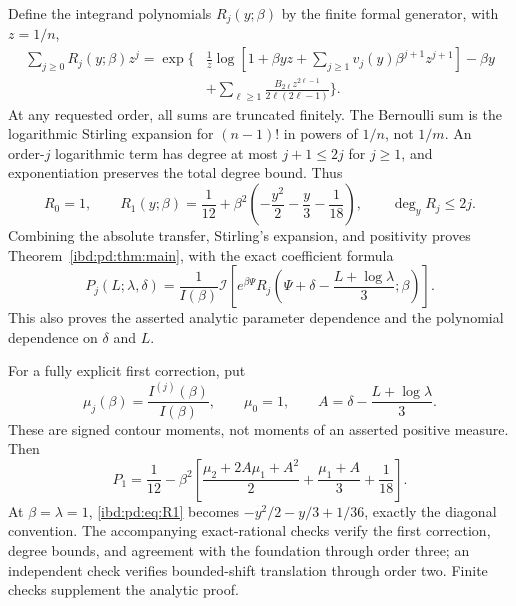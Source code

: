 \documentclass[11pt,letterpaper]{article}
\theoremstyle{remark}\newtheorem{remark}[theorem]{Remark}
\newcommand{\I}{\mathcal I}
\begin{document}
Define the integrand polynomials $R_j(y;\beta)$ by the finite formal generator, with $z=1/n$,
\begin{align}\label{ibd:pd:eq:Rgen}
 \sum_{j\geq0}R_j(y;\beta)z^j
 =\exp\Bigg\{&\frac1z\log\left[1+\beta yz+
 \sum_{j\geq1}v_j(y)\beta^{j+1}z^{j+1}\right]-\beta y\\
 &+\sum_{\ell\geq1}\frac{B_{2\ell}z^{2\ell-1}}{2\ell(2\ell-1)}\Bigg\}.\nonumber
\end{align}
At any requested order, all sums are truncated finitely. The Bernoulli sum is the logarithmic Stirling expansion for $(n-1)!$ in powers of $1/n$, not $1/m$. An order-$j$ logarithmic term has degree at most $j+1\leq2j$ for $j\geq1$, and exponentiation preserves the total degree bound. Thus
\begin{equation}\label{ibd:pd:eq:R1}
 R_0=1,\qquad
 R_1(y;\beta)=\frac1{12}+\beta^2\left(-\frac{y^2}{2}-\frac y3-\frac1{18}\right),
 \qquad\deg_yR_j\leq2j.
\end{equation}
Combining the absolute transfer, Stirling's expansion, and positivity proves Theorem~\ref{ibd:pd:thm:main}, with the exact coefficient formula
\begin{equation}\label{ibd:pd:eq:Pgen}
 P_j(L;\lambda,\delta)=\frac1{I(\beta)}\I\!\left[
 e^{\beta\Psi}R_j\!\left(\Psi+\delta-\frac{L+\log\lambda}{3};\beta\right)\right].
\end{equation}
This also proves the asserted analytic parameter dependence and the polynomial dependence on $\delta$ and $L$.

For a fully explicit first correction, put
\[
 \mu_j(\beta)=\frac{I^{(j)}(\beta)}{I(\beta)},\qquad \mu_0=1,\qquad
 A=\delta-\frac{L+\log\lambda}{3}.
\]
These are signed contour moments, not moments of an asserted positive measure. Then
\begin{equation}\label{ibd:pd:eq:P1}
 P_1=\frac1{12}-\beta^2\left[
 \frac{\mu_2+2A\mu_1+A^2}{2}+
 \frac{\mu_1+A}{3}+\frac1{18}\right].
\end{equation}
At $\beta=\lambda=1$, \eqref{ibd:pd:eq:R1} becomes
$-y^2/2-y/3+1/36$, exactly the diagonal convention. The accompanying exact-rational checks verify the first correction, degree bounds, and agreement with the foundation through order three; an independent check verifies bounded-shift translation through order two. Finite checks supplement the analytic proof.
\end{document}
